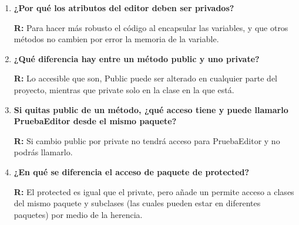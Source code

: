 \documentclass{article}
\begin{document}
\begin{enumerate}
    \item \textbf{\bfseries ¿Por qué los atributos del editor deben ser privados?}
    
    \textbf{R:} Para hacer más robusto el código al encapsular las variables, y que otros métodos no cambien por error la memoria de la variable.

    \item \textbf{\bfseries ¿Qué diferencia hay entre un método public y uno private?}
    
    \textbf{R:} Lo accesible que son, Public puede ser alterado en cualquier parte del proyecto, mientras que private solo en la clase en la que está.

    \item \textbf{\bfseries Si quitas public de un método, ¿qué acceso tiene y puede llamarlo PruebaEditor desde el mismo paquete?}
    
    \textbf{R:} Si cambio public por private no tendrá acceso para PruebaEditor y no podrás llamarlo.

    \item \textbf{\bfseries ¿En qué se diferencia el acceso de paquete de protected?}
    
    \textbf{R:} El protected es igual que el private, pero añade un permite acceso a clases del mismo paquete y subclases (las cuales pueden estar en diferentes paquetes) por medio de la herencia.
\end{enumerate}
\end{document}
